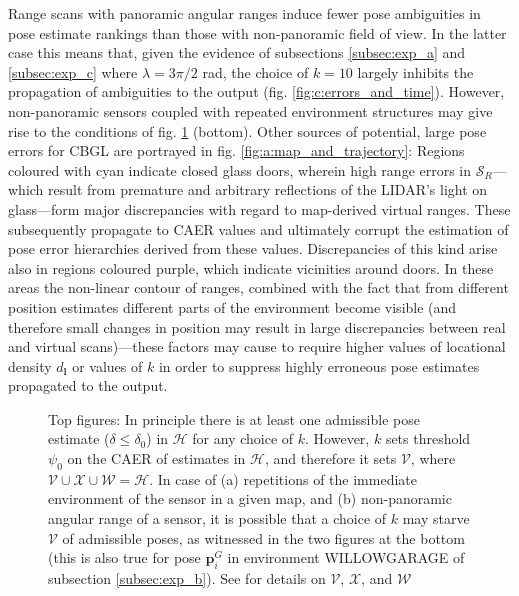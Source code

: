 Range scans with panoramic angular ranges induce fewer pose ambiguities in pose
estimate rankings than those with non-panoramic field of view. In the latter
case this means that, given the evidence of subsections \ref{subsec:exp_a} and
\ref{subsec:exp_c} where $\lambda = 3\pi/2$ rad, the choice of $k=10$ largely
inhibits the propagation of ambiguities to the output (fig.
\ref{fig:c:errors_and_time}).  However, non-panoramic sensors coupled with
repeated environment structures may give rise to the conditions of fig.
\ref{fig:h_and_h_not_fig} (bottom). Other sources of potential, large pose
errors for CBGL are portrayed in fig. \ref{fig:a:map_and_trajectory}:
Regions coloured with cyan indicate closed glass doors, wherein high range
errors in $\mathcal{S}_R$---which result from premature and arbitrary
reflections of the LIDAR's light on glass---form major discrepancies with
regard to map-derived virtual ranges. These subsequently propagate to CAER
values and ultimately corrupt the estimation of pose error hierarchies derived
from these values.  Discrepancies of this kind arise also in regions coloured
purple, which indicate vicinities around doors. In these areas the non-linear
contour of ranges, combined with the fact that from different position
estimates different parts of the environment become visible (and therefore
small changes in position may result in large discrepancies between real and
virtual scans)---these factors may cause to require higher values of locational
density $d_{\bm{l}}$ or values of $k$ in order to suppress highly erroneous
pose estimates propagated to the output.

\begin{figure}[H]\vspace{-0.2cm}
  
  \vspace{0.3cm}
  \caption{\small Top figures: In principle there is at least one admissible
           pose estimate ($\delta \leq \delta_0$) in $\mathcal{H}$ for any
           choice of $k$. However, $k$ sets threshold $\psi_0$ on the CAER of
           estimates in $\mathcal{H}$, and therefore it sets $\mathcal{V}$,
           where $\mathcal{V} \cup \mathcal{X} \cup \mathcal{W} = \mathcal{H}$.
           In case of (a) repetitions of the immediate environment of the
           sensor in a given map, and (b) non-panoramic angular range of a
           sensor, it is possible that a choice of $k$ may starve $\mathcal{V}$
           of admissible poses, as witnessed in the two figures at the bottom
           (this is also true for pose $\bm{p}_{i}^G$ in environment
           WILLOWGARAGE of subsection \ref{subsec:exp_b}). See \cite{cbglarxiv}
           for details on $\mathcal{V}$, $\mathcal{X}$, and $\mathcal{W}$
        }
  \label{fig:h_and_h_not_fig}
\end{figure}
